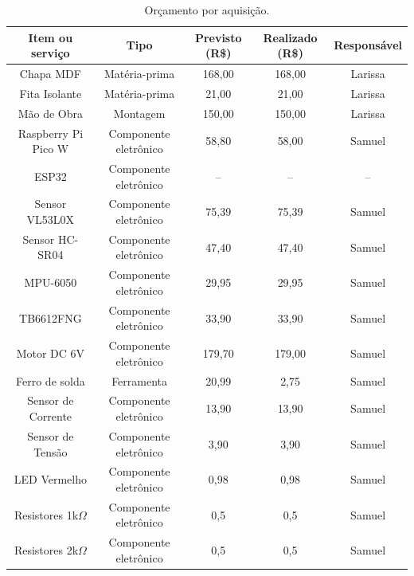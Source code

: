 \begin{table}[htpb]
\begin{center}
\footnotesize
\caption{Orçamento por aquisição.}
\begin{tabular}{|c|c|c|c|c|}
\hline
\textbf{Item ou serviço} & \textbf{Tipo} & \textbf{Previsto (R\$)} & \textbf{Realizado (R\$)} & \textbf{Responsável} \\ \hline
Chapa MDF      & Matéria-prima & 168,00   & 168,00 & Larissa                   \\ \hline
Fita Isolante        & Matéria-prima & 21,00   & 21,00 & Larissa                    \\ \hline
Mão de Obra & Montagem & 150,00   & 150,00 & Larissa                    \\ \hline
Raspberry Pi Pico W      & Componente eletrônico & 58,80  & 58,00 & Samuel                     \\ \hline
ESP32      & Componente eletrônico & --   & -- & --                     \\ \hline
Sensor VL53L0X     & Componente eletrônico & 75,39   & 75,39 & Samuel                     \\ \hline
Sensor HC-SR04 & Componente eletrônico & 47,40   & 47,40 & Samuel                     \\ \hline
MPU-6050 & Componente eletrônico & 29,95   & 29,95 & Samuel                   \\ \hline
TB6612FNG & Componente eletrônico & 33,90   & 33,90 & Samuel                     \\ \hline
Motor DC 6V & Componente eletrônico & 179,70   & 179,00 & Samuel                     \\ \hline
Ferro de solda & Ferramenta & 20,99   & 2,75 & Samuel                     \\ \hline
Sensor de Corrente & Componente eletrônico & 13,90   & 13,90 & Samuel                     \\ \hline
Sensor de Tensão & Componente eletrônico & 3,90   & 3,90 & Samuel                     \\ \hline
LED Vermelho & Componente eletrônico & 0,98   & 0,98 & Samuel                     \\ \hline
Resistores 1k$\Omega$ & Componente eletrônico & 0,5   & 0,5 & Samuel                     \\ \hline
Resistores 2k$\Omega$ & Componente eletrônico & 0,5   & 0,5 & Samuel                     \\ \hline

\end{tabular}
\end{center}
\end{table}
